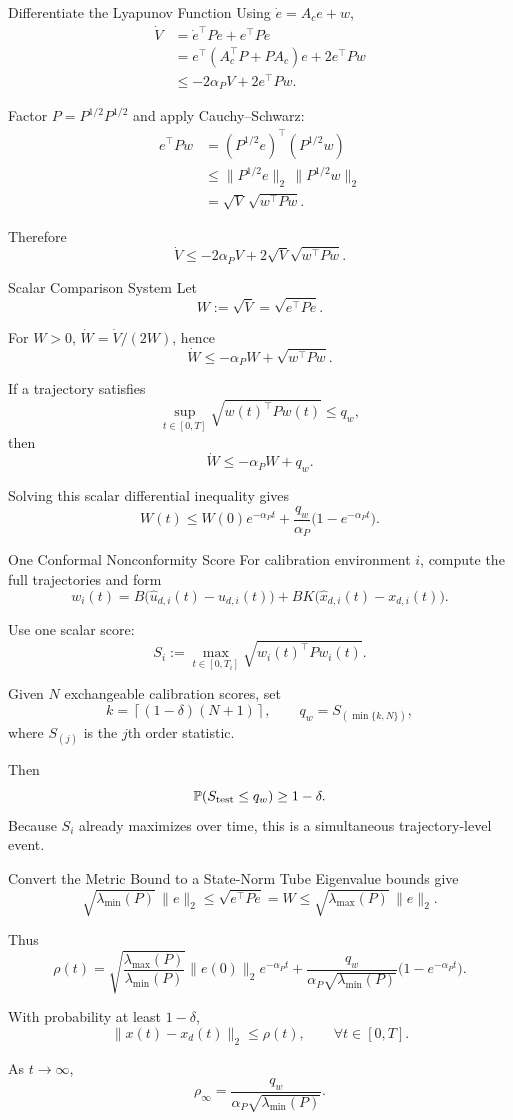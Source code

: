 \documentclass[aspectratio=43,11pt]{beamer}
\newcommand{\xd}{x_d}
\newcommand{\lmin}{\lambda_{\min}}
\newcommand{\lmax}{\lambda_{\max}}
\begin{document}
\begin{frame}{Differentiate the Lyapunov Function}
Using $\dot e=A_c e+w$,
\begin{align*}
\dot V
&=\dot e^\top Pe+e^\top P\dot e\\
&=e^\top(A_c^\top P+PA_c)e+2e^\top Pw\\
&\leq -2\alpha_P V+2e^\top Pw.
\end{align*}

Factor $P=P^{1/2}P^{1/2}$ and apply Cauchy--Schwarz:
\begin{align*}
e^\top Pw
&=(P^{1/2}e)^\top(P^{1/2}w)\\
&\leq \|P^{1/2}e\|_2\,\|P^{1/2}w\|_2\\
&=\sqrt V\,\sqrt{w^\top P w}.
\end{align*}

Therefore
\[
\boxed{\dot V\leq-2\alpha_PV+2\sqrt V\sqrt{w^\top Pw}.}
\]
\end{frame}

\begin{frame}{Scalar Comparison System}
Let
\[
W:=\sqrt V=\sqrt{e^\top Pe}.
\]

For $W>0$, $\dot W=\dot V/(2W)$, hence
\[
\dot W\leq -\alpha_P W+\sqrt{w^\top P w}.
\]

If a trajectory satisfies
\[
\sup_{t\in[0,T]}\sqrt{w(t)^\top P w(t)}\leq q_w,
\]
then
\[
\dot W\leq-\alpha_PW+q_w.
\]

Solving this scalar differential inequality gives
\[
\boxed{
W(t)\leq W(0)e^{-\alpha_Pt}
+\frac{q_w}{\alpha_P}\big(1-e^{-\alpha_Pt}\big).}
\]
\end{frame}

\begin{frame}{One Conformal Nonconformity Score}
For calibration environment $i$, compute the full trajectories and form
\[
w_i(t)=B\big(\hat u_{d,i}(t)-u_{d,i}(t)\big)
+BK\big(\hat x_{d,i}(t)-x_{d,i}(t)\big).
\]

Use one scalar score:
\[
\boxed{
S_i:=\max_{t\in[0,T_i]}
\sqrt{w_i(t)^\top P w_i(t)}.}
\]

Given $N$ exchangeable calibration scores, set
\[
k=\left\lceil(1-\delta)(N+1)\right\rceil,
\qquad
q_w=S_{(\min\{k,N\})},
\]
where $S_{(j)}$ is the $j$th order statistic.

Then
\[
\mathbb P(S_{\rm test}\leq q_w)\geq1-\delta.
\]
Because $S_i$ already maximizes over time, this is a simultaneous trajectory-level event.
\end{frame}

\begin{frame}{Convert the Metric Bound to a State-Norm Tube}
Eigenvalue bounds give
\[
\sqrt{\lmin(P)}\,\|e\|_2
\leq \sqrt{e^\top Pe}=W
\leq \sqrt{\lmax(P)}\,\|e\|_2.
\]

Thus
\[
\boxed{
\rho(t)=
\sqrt{\frac{\lmax(P)}{\lmin(P)}}\|e(0)\|_2e^{-\alpha_Pt}
+\frac{q_w}{\alpha_P\sqrt{\lmin(P)}}
\big(1-e^{-\alpha_Pt}\big).}
\]

With probability at least $1-\delta$,
\[
\|x(t)-\xd(t)\|_2\leq\rho(t),
\qquad\forall t\in[0,T].
\]

As $t\to\infty$,
\[
\boxed{\rho_\infty=\frac{q_w}{\alpha_P\sqrt{\lmin(P)}}.}
\]
\end{frame}
\end{document}

